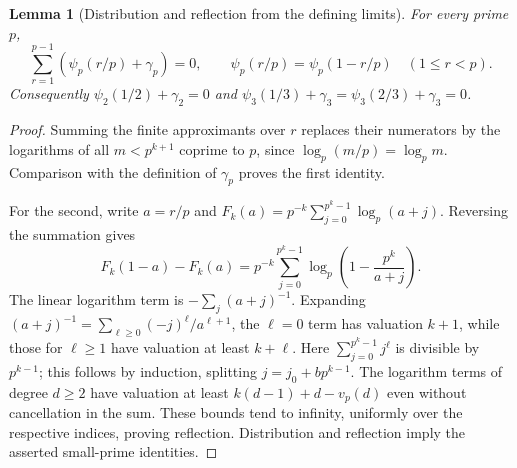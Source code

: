 \documentclass[11pt,a4paper]{article}
\newtheorem{lemma}[theorem]{Lemma}
\theoremstyle{definition}
\theoremstyle{remark}
\numberwithin{equation}{section}
\begin{document}
\begin{lemma}[Distribution and reflection from the defining limits]
\label{p5:conf:distribution}
For every prime $p$,
\[
 \sum_{r=1}^{p-1}(\psi_p(r/p)+\gamma_p)=0,
 \qquad \psi_p(r/p)=\psi_p(1-r/p)\quad(1\le r<p).
\]
Consequently $\psi_2(1/2)+\gamma_2=0$ and
$\psi_3(1/3)+\gamma_3=\psi_3(2/3)+\gamma_3=0$.
\end{lemma}
\begin{proof}
Summing the finite approximants over $r$ replaces their numerators
by the logarithms of all $m<p^{k+1}$ coprime to $p$, since
$\log_p(m/p)=\log_p m$.  Comparison with the definition of $\gamma_p$
proves the first identity.

For the second, write $a=r/p$ and
$F_k(a)=p^{-k}\sum_{j=0}^{p^k-1}\log_p(a+j)$.
Reversing the summation gives
\[
 F_k(1-a)-F_k(a)=p^{-k}\sum_{j=0}^{p^k-1}
 \log_p\left(1-\frac{p^k}{a+j}\right).
\]
The linear logarithm term is $-\sum_j(a+j)^{-1}$.
Expanding $(a+j)^{-1}=\sum_{\ell\ge0}(-j)^\ell/a^{\ell+1}$,
the $\ell=0$ term has valuation $k+1$, while those for $\ell\ge1$
have valuation at least $k+\ell$.
Here $\sum_{j=0}^{p^k-1}j^\ell$ is divisible by $p^{k-1}$;
this follows by induction, splitting $j=j_0+bp^{k-1}$.
The logarithm terms of degree $d\ge2$ have valuation at least
$k(d-1)+d-v_p(d)$ even without cancellation in the sum.
These bounds tend to infinity, uniformly over the respective
indices, proving reflection.  Distribution and reflection imply
the asserted small-prime identities.
\end{proof}
\end{document}
